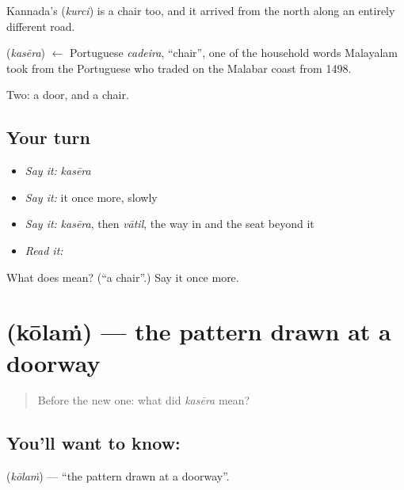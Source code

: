 Kannada's  (\emph{kurci}) is a chair too, and it arrived from the north along an entirely different road.

\begin{cousinweb}
\textbf{} (\emph{kasēra}) $\leftarrow$ Portuguese \emph{cadeira}, \textquotedblleft{}chair\textquotedblright{}, one of the household words Malayalam took from the Portuguese who traded on the Malabar coast from 1498.
\end{cousinweb}

\begin{grammarlens}[title={What you've built}]
Two: a door, and a chair.
\end{grammarlens}

\subsection*{Your turn}
\begin{itemize}
\raggedright
  \item \emph{Say it:} \emph{kasēra}
  \item \emph{Say it:} it once more, slowly
  \item \emph{Say it:} \emph{kasēra}, then \emph{vātil}, the way in and the seat beyond it
  \item \emph{Read it:} \textbf{}
\end{itemize}

\begin{tcolorbox}[breakable,colback=teal!4,colframe=teal!35!black,title={Before you move on}]
What does  mean? (\textquotedblleft{}a chair\textquotedblright{}.) Say it once more.
\end{tcolorbox}
\section[\texorpdfstring{\ml{കോലം} (kōlaṁ)}{കോലം (kōlaṁ)}]{ (kōlaṁ) — the pattern drawn at a doorway}

\label{lesson:ML-C52-kolam}



\begin{quote}
Before the new one: what did \emph{kasēra} mean?
\end{quote}

\subsection*{You'll want to know: }
\textbf{} (\emph{kōlaṁ}) — \textquotedblleft{}the pattern drawn at a doorway\textquotedblright{}.

